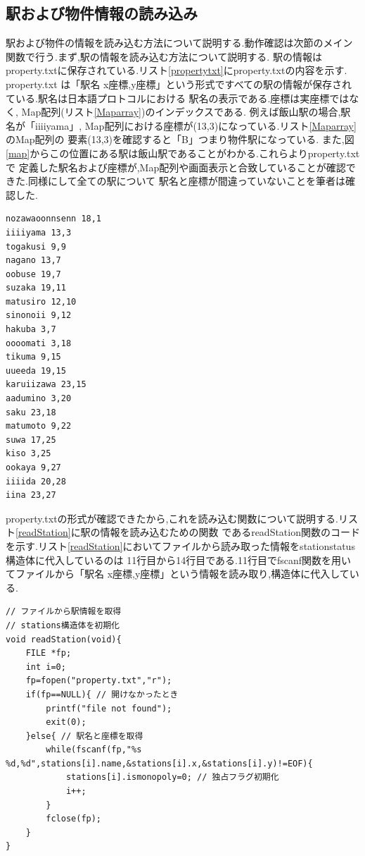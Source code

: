 \documentclass[a4j]{jarticle}
\begin{document}
  \subsection{駅および物件情報の読み込み}
  駅および物件の情報を読み込む方法について説明する.動作確認は次節のメイン関数で行う.まず,駅の情報を読み込む方法について説明する.
  駅の情報はproperty.txtに保存されている.リスト\ref{propertytxt}にproperty.txtの内容を示す. property.txt
  は「駅名 x座標,y座標」という形式ですべての駅の情報が保存されている.駅名は日本語プロトコルにおける
  駅名の表示である.座標は実座標ではなく, Map配列(リスト\ref{Maparray})のインデックスである.
  例えば飯山駅の場合,駅名が「iiiiyama」, Map配列における座標が(13,3)になっている.リスト\ref{Maparray}のMap配列の
  要素(13,3)を確認すると「B」つまり物件駅になっている.
  また,図\ref{map}からこの位置にある駅は飯山駅であることがわかる.これらよりproperty.txtで
  定義した駅名および座標が,Map配列や画面表示と合致していることが確認できた.同様にして全ての駅について
  駅名と座標が間違っていないことを筆者は確認した.
\begin{lstlisting}[basicstyle=\ttfamily\footnotesize, frame=single,label=propertytxt,caption=property.txt]
nozawaoonnsenn 18,1
iiiiyama 13,3
togakusi 9,9
nagano 13,7
oobuse 19,7
suzaka 19,11
matusiro 12,10
sinonoii 9,12
hakuba 3,7
oooomati 3,18
tikuma 9,15
uueeda 19,15
karuiizawa 23,15
aadumino 3,20
saku 23,18
matumoto 9,22
suwa 17,25
kiso 3,25
ookaya 9,27
iiiida 20,28
iina 23,27
        \end{lstlisting}   
    
    property.txtの形式が確認できたから,これを読み込む関数について説明する.リスト\ref{readStation}に駅の情報を読み込むための関数
    であるreadStation関数のコードを示す.リスト\ref{readStation}においてファイルから読み取った情報をstationstatus構造体に代入しているのは
    11行目から14行目である.11行目でfscanf関数を用いてファイルから「駅名 x座標,y座標」という情報を読み取り,構造体に代入している.
\begin{lstlisting}[basicstyle=\ttfamily\footnotesize, frame=single,label=readStation,caption=readStation関数]
// ファイルから駅情報を取得
// stations構造体を初期化
void readStation(void){
    FILE *fp;
    int i=0;
    fp=fopen("property.txt","r");
    if(fp==NULL){ // 開けなかったとき
        printf("file not found");
        exit(0);
    }else{ // 駅名と座標を取得
        while(fscanf(fp,"%s %d,%d",stations[i].name,&stations[i].x,&stations[i].y)!=EOF){
            stations[i].ismonopoly=0; // 独占フラグ初期化
            i++;
        }
        fclose(fp);
    }
}

        \end{lstlisting}     
    
\end{document}

